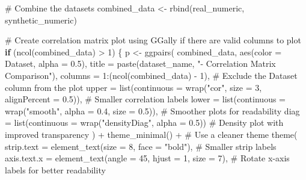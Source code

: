 \documentclass[
  letterpaper,
  DIV=11,
  numbers=noendperiod]{scrartcl}
\newenvironment{Shaded}{\begin{snugshade}}{\end{snugshade}}
\newcommand{\AttributeTok}[1]{\textcolor[rgb]{0.40,0.45,0.13}{#1}}
\newcommand{\CommentTok}[1]{\textcolor[rgb]{0.37,0.37,0.37}{#1}}
\newcommand{\ControlFlowTok}[1]{\textcolor[rgb]{0.00,0.23,0.31}{\textbf{#1}}}
\newcommand{\DecValTok}[1]{\textcolor[rgb]{0.68,0.00,0.00}{#1}}
\newcommand{\FloatTok}[1]{\textcolor[rgb]{0.68,0.00,0.00}{#1}}
\newcommand{\FunctionTok}[1]{\textcolor[rgb]{0.28,0.35,0.67}{#1}}
\newcommand{\NormalTok}[1]{\textcolor[rgb]{0.00,0.23,0.31}{#1}}
\newcommand{\OtherTok}[1]{\textcolor[rgb]{0.00,0.23,0.31}{#1}}
\newcommand{\SpecialCharTok}[1]{\textcolor[rgb]{0.37,0.37,0.37}{#1}}
\newcommand{\StringTok}[1]{\textcolor[rgb]{0.13,0.47,0.30}{#1}}
\begin{document}
\begin{Shaded}
\begin{Highlighting}[]
  \CommentTok{\# Combine the datasets}
\NormalTok{  combined\_data }\OtherTok{\textless{}{-}} \FunctionTok{rbind}\NormalTok{(real\_numeric, synthetic\_numeric)}

  \CommentTok{\# Create correlation matrix plot using GGally if there are valid columns to plot}
  \ControlFlowTok{if}\NormalTok{ (}\FunctionTok{ncol}\NormalTok{(combined\_data) }\SpecialCharTok{\textgreater{}} \DecValTok{1}\NormalTok{) \{}
\NormalTok{    p }\OtherTok{\textless{}{-}} \FunctionTok{ggpairs}\NormalTok{(}
\NormalTok{      combined\_data, }
      \FunctionTok{aes}\NormalTok{(}\AttributeTok{color =}\NormalTok{ Dataset, }\AttributeTok{alpha =} \FloatTok{0.5}\NormalTok{), }
      \AttributeTok{title =} \FunctionTok{paste}\NormalTok{(dataset\_name, }\StringTok{"{-} Correlation Matrix Comparison"}\NormalTok{),}
      \AttributeTok{columns =} \DecValTok{1}\SpecialCharTok{:}\NormalTok{(}\FunctionTok{ncol}\NormalTok{(combined\_data) }\SpecialCharTok{{-}} \DecValTok{1}\NormalTok{),  }\CommentTok{\# Exclude the \textquotesingle{}Dataset\textquotesingle{} column from the plot}
      \AttributeTok{upper =} \FunctionTok{list}\NormalTok{(}\AttributeTok{continuous =} \FunctionTok{wrap}\NormalTok{(}\StringTok{"cor"}\NormalTok{, }\AttributeTok{size =} \DecValTok{3}\NormalTok{, }\AttributeTok{alignPercent =} \FloatTok{0.5}\NormalTok{)),  }\CommentTok{\# Smaller correlation labels}
      \AttributeTok{lower =} \FunctionTok{list}\NormalTok{(}\AttributeTok{continuous =} \FunctionTok{wrap}\NormalTok{(}\StringTok{"smooth"}\NormalTok{, }\AttributeTok{alpha =} \FloatTok{0.4}\NormalTok{, }\AttributeTok{size =} \FloatTok{0.5}\NormalTok{)),  }\CommentTok{\# Smoother plots for readability}
      \AttributeTok{diag =} \FunctionTok{list}\NormalTok{(}\AttributeTok{continuous =} \FunctionTok{wrap}\NormalTok{(}\StringTok{"densityDiag"}\NormalTok{, }\AttributeTok{alpha =} \FloatTok{0.5}\NormalTok{))  }\CommentTok{\# Density plot with improved transparency}
\NormalTok{    ) }\SpecialCharTok{+}
      \FunctionTok{theme\_minimal}\NormalTok{() }\SpecialCharTok{+}  \CommentTok{\# Use a cleaner theme}
      \FunctionTok{theme}\NormalTok{(}
        \AttributeTok{strip.text =} \FunctionTok{element\_text}\NormalTok{(}\AttributeTok{size =} \DecValTok{8}\NormalTok{, }\AttributeTok{face =} \StringTok{"bold"}\NormalTok{),  }\CommentTok{\# Smaller strip labels}
        \AttributeTok{axis.text.x =} \FunctionTok{element\_text}\NormalTok{(}\AttributeTok{angle =} \DecValTok{45}\NormalTok{, }\AttributeTok{hjust =} \DecValTok{1}\NormalTok{, }\AttributeTok{size =} \DecValTok{7}\NormalTok{),  }\CommentTok{\# Rotate x{-}axis labels for better readability}

\end{Highlighting}
\end{Shaded}
\end{document}

